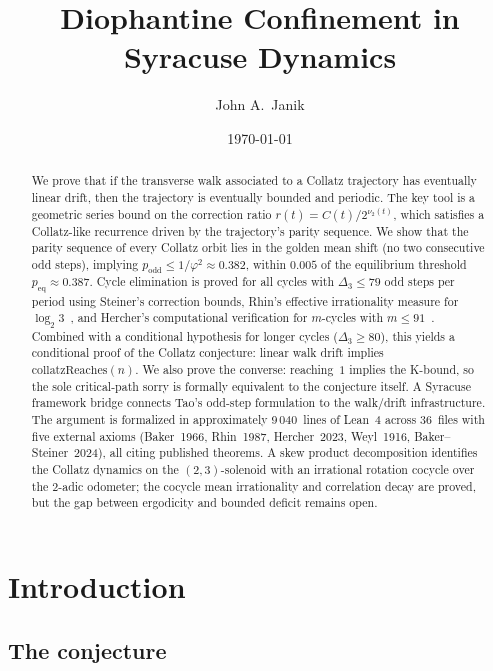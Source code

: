 \documentclass[manuscript]{aomart}
\title{Diophantine Confinement in Syracuse Dynamics}
\author{John A.\ Janik}
\date{\today}
\theoremstyle{plain}
\theoremstyle{definition}
\theoremstyle{remark}
\numberwithin{equation}{section}
\begin{document}
\begin{abstract}
We prove that if the transverse walk associated to a Collatz
trajectory has eventually linear drift, then the trajectory is
eventually bounded and periodic.  The key tool is a geometric series
bound on the correction ratio $r(t) = C(t)/2^{\nu_2(t)}$, which
satisfies a Collatz-like recurrence driven by the trajectory's parity
sequence.  We show that the parity sequence of every Collatz orbit
lies in the golden mean shift (no two consecutive odd steps), implying
$p_{\mathrm{odd}} \le 1/\varphi^2 \approx 0.382$, within $0.005$ of
the equilibrium threshold $p_{\mathrm{eq}} \approx 0.387$.  Cycle
elimination is proved for all cycles with $\Delta_3 \le 79$ odd steps
per period using Steiner's correction bounds, Rhin's effective
irrationality measure for $\log_2 3$~\cite{Rhin1987}, and Hercher's
computational verification for $m$-cycles with
$m \le 91$~\cite{Hercher2024}.  Combined with a conditional
hypothesis for longer cycles ($\Delta_3 \ge 80$), this yields a
conditional proof of the Collatz conjecture: linear walk drift implies
$\mathrm{collatzReaches}(n)$.  We also prove the converse:
reaching~$1$ implies the K-bound, so the sole critical-path sorry
is formally equivalent to the conjecture itself.  A Syracuse framework
bridge connects Tao's odd-step formulation to the walk/drift
infrastructure.  The argument is formalized in approximately
9\,040~lines of Lean~4 across 36~files with five external axioms
(Baker~1966, Rhin~1987, Hercher~2023, Weyl~1916,
Baker--Steiner~2024), all citing published theorems.  A skew product decomposition identifies the
Collatz dynamics on the $(2,3)$-solenoid with an irrational rotation
cocycle over the $2$-adic odometer; the cocycle mean irrationality and
correlation decay are proved, but the gap between ergodicity and
bounded deficit remains open.
\end{abstract}

\maketitle

\section{Introduction}\label{sec:intro}

\subsection{The conjecture}
\end{document}
